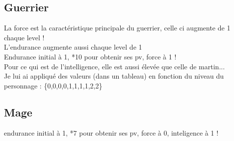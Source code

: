 \documentclass[a4paper,titlepage]{article}
\begin{document}
\subsection{Guerrier}
	La force est la caractéristique principale du guerrier, celle ci augmente de 1 chaque level !\\
	L'endurance augmente aussi chaque level de 1\\
	Endurance initial à 1, *10 pour obtenir ses pv, force à 1 !\\
	Pour ce qui est de l'intelligence, elle est aussi élevée que celle de martin...\\ Je lui ai appliqué des valeurs (dans un tableau) en fonction du niveau du personnage : 	\{0,0,0,0,1,1,1,1,2,2\}
	
\subsection{Mage}
	endurance initial à 1, *7 pour obtenir ses pv, force à 0, inteligence à 1 !
\end{document}
